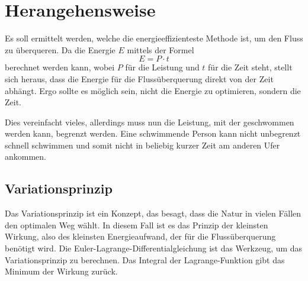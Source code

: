 %
%
%
%
\section{Herangehensweise\label{schwimmen:section:teil0}}

Es soll ermittelt werden, welche die energieeffizienteste Methode
ist, um den Fluss zu überqueren. Da die Energie \(E\) mittels der
Formel \[E = P \cdot t\] berechnet werden kann, wobei \(P\) für die
Leistung und \(t\) für die Zeit steht, stellt sich heraus, dass die
Energie für die Flussüberquerung direkt von der Zeit abhängt. Ergo
sollte es möglich sein, nicht die Energie zu optimieren, sondern
die Zeit.

Dies vereinfacht vieles, allerdings muss nun die Leistung, mit der
geschwommen werden kann, begrenzt werden. Eine schwimmende Person
kann nicht unbegrenzt schnell schwimmen und somit nicht in beliebig
kurzer Zeit am anderen Ufer ankommen.

\subsection{Variationsprinzip}
Das Variationsprinzip ist ein Konzept, das besagt, dass die Natur
in vielen Fällen den optimalen Weg wählt. In diesem Fall ist es das
Prinzip der kleinsten Wirkung, also des kleinsten Energieaufwand,
der für die Flussüberquerung benötigt wird. Die
Euler-Lagrange-Differentialgleichung ist das Werkzeug, um das
Variationsprinzip zu berechnen. Das Integral der Lagrange-Funktion
gibt das Minimum der Wirkung zurück.


